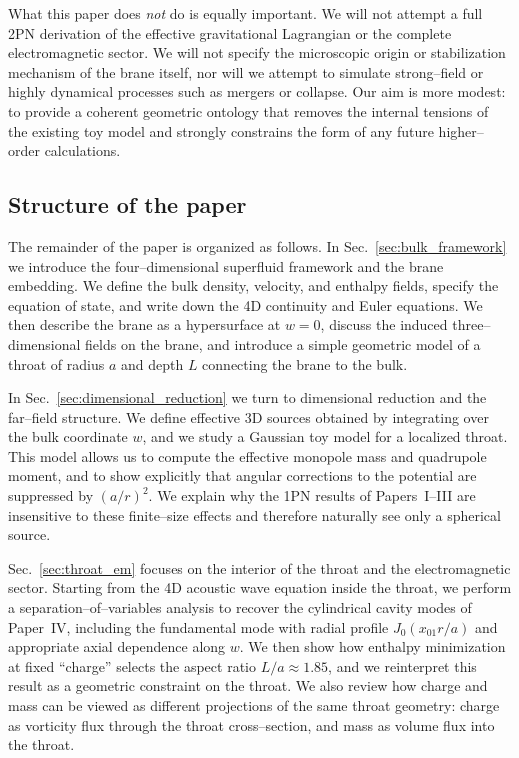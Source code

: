 \documentclass[12pt]{article}
\begin{document}
What this paper does \emph{not} do is equally important.  We will not
attempt a full 2PN derivation of the effective gravitational Lagrangian or
the complete electromagnetic sector.  We will not specify the microscopic
origin or stabilization mechanism of the brane itself, nor will we attempt
to simulate strong–field or highly dynamical processes such as mergers or
collapse.  Our aim is more modest: to provide a coherent geometric ontology
that removes the internal tensions of the existing toy model and strongly
constrains the form of any future higher–order calculations.

\subsection{Structure of the paper}
\label{subsec:intro_structure}

The remainder of the paper is organized as follows.  In
Sec.~\ref{sec:bulk_framework} we introduce the four–dimensional superfluid
framework and the brane embedding.  We define the bulk density, velocity,
and enthalpy fields, specify the equation of state, and write down the 4D
continuity and Euler equations.  We then describe the brane as a
hypersurface at $w=0$, discuss the induced three–dimensional fields on the
brane, and introduce a simple geometric model of a throat of radius $a$ and
depth $L$ connecting the brane to the bulk.

In Sec.~\ref{sec:dimensional_reduction} we turn to dimensional reduction and
the far–field structure.  We define effective 3D sources obtained by
integrating over the bulk coordinate $w$, and we study a Gaussian toy model
for a localized throat.  This model allows us to compute the effective
monopole mass and quadrupole moment, and to show explicitly that angular
corrections to the potential are suppressed by $(a/r)^2$.  We explain why
the 1PN results of Papers~I--III are insensitive to these finite–size
effects and therefore naturally see only a spherical source.

Sec.~\ref{sec:throat_em} focuses on the interior of the throat and the
electromagnetic sector.  Starting from the 4D acoustic wave equation inside
the throat, we perform a separation–of–variables analysis to recover the
cylindrical cavity modes of Paper~IV, including the fundamental mode with
radial profile $J_0(x_{01} r/a)$ and appropriate axial dependence along $w$.
We then show how enthalpy minimization at fixed ``charge'' selects the
aspect ratio $L/a \approx 1.85$, and we reinterpret this result as a
geometric constraint on the throat.  We also review how charge and mass can
be viewed as different projections of the same throat geometry: charge as
vorticity flux through the throat cross–section, and mass as volume flux
into the throat.
\end{document}
